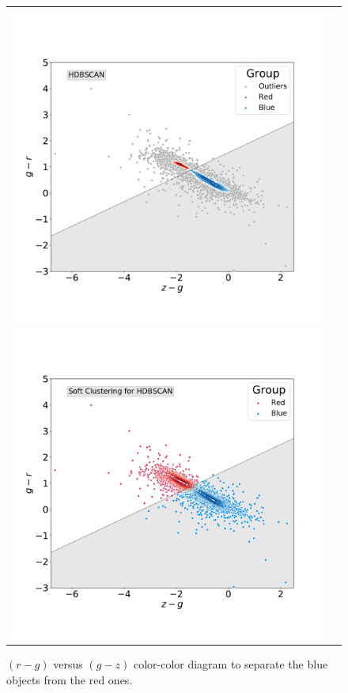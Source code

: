\documentclass[fleqn,usenatbib]{mnras}
\begin{document}
{\begin{figure}
\centering
\begin{tabular}{l l}
  \includegraphics[width=0.5\linewidth, trim=10 10 5 8, clip]{Figs/blued-red-hdbscan.pdf}
   \includegraphics[width=0.5\linewidth, trim=10 10 5 8. clip]{Figs/blue-red-hdbscan-soft-alternative.pdf}
  \end{tabular}  
  \caption{ $(r - g)$ versus $(g - z)$ color-color diagram to separate the blue objects from the red ones.}
\label{fig:hdbscan}
\end{figure}


}
\end{document}
